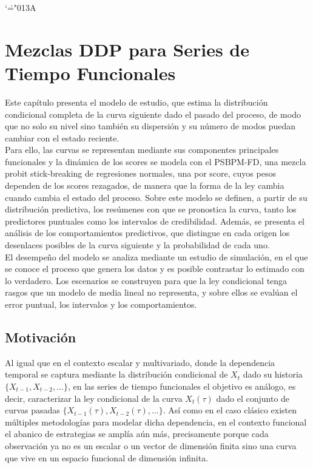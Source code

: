 \ifdefined\decimalpoint\decimalpoint\else\mathcode`\.="013A \fi


 \chapter{Mezclas DDP para Series de Tiempo Funcionales}
\label{03_00_00_mezclas_ddp_series_tiempo_funcionales}

Este capítulo presenta el modelo de estudio, que estima la distribución condicional completa de la curva siguiente dado el pasado del proceso, de modo que no solo su nivel sino también su dispersión y su número de modos puedan cambiar con el estado reciente.\\

Para ello, las curvas se representan mediante sus componentes principales funcionales y la dinámica de los scores se modela con el PSBPM-FD, una mezcla probit stick-breaking de regresiones normales, una por score, cuyos pesos dependen de los scores rezagados, de manera que la forma de la ley cambia cuando cambia el estado del proceso. Sobre este modelo se definen, a partir de su distribución predictiva, los resúmenes con que se pronostica la curva, tanto los predictores puntuales como los intervalos de credibilidad. Además, se presenta el análisis de los comportamientos predictivos, que distingue en cada origen los desenlaces posibles de la curva siguiente y la probabilidad de cada uno.\\

El desempeño del modelo se analiza mediante un estudio de simulación, en el que se conoce el proceso que genera los datos y es posible contrastar lo estimado con lo verdadero. Los escenarios se construyen para que la ley condicional tenga rasgos que un modelo de media lineal no representa, y sobre ellos se evalúan el error puntual, los intervalos y los comportamientos.

\section{Motivación}
\label{03_01_00_motivacion}
 
Al igual que en el contexto escalar y multivariado, donde la dependencia temporal se captura mediante la distribución condicional de $X_t$ dado su historia $\{X_{t-1}, X_{t-2}, \ldots\}$, en las series de tiempo funcionales el objetivo es análogo, es decir, caracterizar la ley condicional de la curva $X_t(\tau)$ dado el conjunto de curvas pasadas $\{X_{t-1}(\tau), X_{t-2}(\tau), \ldots\}$. Así como en el caso clásico existen múltiples metodologías para modelar dicha dependencia, en el contexto funcional el abanico de estrategias se amplía aún más, precisamente porque cada observación ya no es un escalar o un vector de dimensión finita sino una curva que vive en un espacio funcional de dimensión infinita.\\
 
